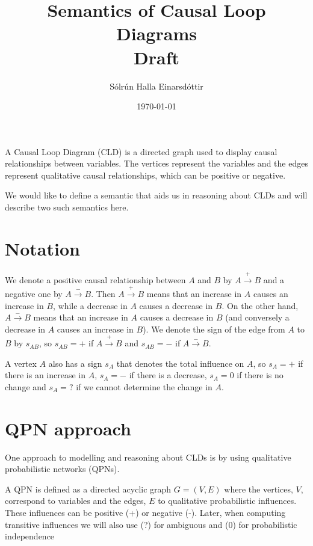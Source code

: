 \documentclass[a4paper,11pt]{article}
\title{Semantics of Causal Loop Diagrams\\ Draft}
\author{Sólrún Halla Einarsdóttir}
\date{\today}
\begin{document}
\maketitle
A Causal Loop Diagram (CLD) is a directed graph used to display causal
relationships between variables.
%
The vertices represent the variables and the edges represent qualitative
causal relationships, which can be positive or negative.


We would like to define a semantic that aids us in reasoning about CLDs and will
describe two such semantics here.

\section{Notation}
We denote a positive causal relationship between $A$ and $B$ by
$A\xrightarrow{+} B$ and a negative one by $A \xrightarrow{-} B$.
%
Then $A \xrightarrow{+} B$ means that an increase in $A$ causes an
increase in $B$, while a decrease in $A$ causes a decrease in $B$.
%
On the other hand, $A\xrightarrow{-} B$ means that an increase in $A$
causes a decrease in $B$ (and conversely a decrease in $A$ causes an
increase in $B$).
%
We denote the sign of the edge from $A$ to $B$ by $s_{AB}$, so
$s_{AB}= +$ if $A\xrightarrow{+} B$ and $s_{AB}=-$ if
$A\xrightarrow{-} B$.

A vertex $A$ also has a sign $s_A$ that denotes the total influence on $A$, so
$s_A=+$ if there is an increase in $A$, $s_A=-$ if there is a decrease, $s_A=0$
if there is no change and $s_A=?$ if we cannot determine the change in $A$.

\section{QPN approach}

One approach to modelling and reasoning about CLDs is by using qualitative
probabilistic networks (QPNs).

A QPN is defined as a directed
acyclic graph $G=(V,E)$ where the vertices, $V$, correspond to
variables and the edges, $E$ to qualitative probabilistic influences.
%
These influences can be positive (+) or negative (-).
%
Later, when computing transitive influences we will also use (?) for
ambiguous and (0) for probabilistic independence
\end{document}
